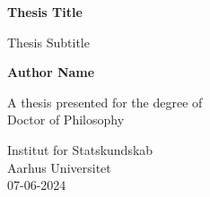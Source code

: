 \begin{titlepage}
  \begin{center}
      \vspace*{1cm}

      \textbf{Thesis Title}

      \vspace{0.5cm}
       Thesis Subtitle

      \vspace{1.5cm}

      \textbf{Author Name}

      \vfill

      A thesis presented for the degree of\\
      Doctor of Philosophy

      \vspace{0.8cm}


      Institut for Statskundskab\\
      Aarhus Universitet\\
      07-06-2024

  \end{center}
\end{titlepage}